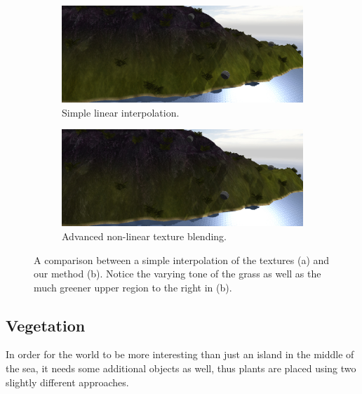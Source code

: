 \begin{figure}[H]
\begin{subfigure}{0.78\textwidth}
  \centering
  \includegraphics[width=0.9\linewidth]{images/textureBlendingComparison2_simple.jpg}
  \caption{Simple linear interpolation.}
\end{subfigure}

\begin{subfigure}{0.78\textwidth}
  \centering
  \includegraphics[width=0.9\linewidth]{images/textureBlendingComparison2_advanced.jpg}
  \caption{Advanced non-linear texture blending.}
\end{subfigure}
\caption[Simple and advanced texture blending comparison 2.]{A comparison between a simple interpolation of the textures (a) and our method (b). Notice the varying tone of the grass as well as the much greener upper region to the right in (b).}
\label{fig:textureComparison2}
\end{figure}

\newpage
\subsection{Vegetation}
In order for the world to be more interesting than just an island in the middle of the sea, it needs some additional objects as well, thus plants are placed using two slightly different approaches.

